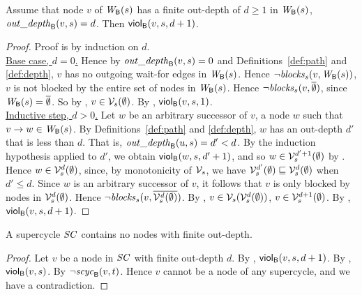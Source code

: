 \begin{proposition} \label{prop:outdepth-finite-implies-scViol}
Assume that node $v$ of $\wfg{\B}{s}$ has a finite out-depth of $d \ge 1$ in $\wfg{\B}{s}$, \ie 
$\wodepth{\B}{v}{s} = d$. Then $\viol{v}{d+1}{s}$. 
\end{proposition}
%
\begin{proof}
Proof is by induction on $d$.\\

\noindent
\ul{Base case, $d=0$.} Hence by $\wodepth{\B}{v}{s} = 0$ and Definitions~\ref{def:path} and \ref{def:depth},  
$v$ has no outgoing wait-for edges in $\wfg{\B}{s}$. Hence $\neg \blocks{s}{v}{\wfg{\B}{s}}$, \ie $v$ is not blocked by the entire set of nodes in 
$\wfg{\B}{s}$. Hence $\neg \blocks{s}{v}{\compl{\ewfg}}$, since $\wfg{\B}{s} = \compl{\ewfg}$. So by , 
$v \in \VFs{s}{\ewfg}$. By , $\scVd{v}{1}{s}$.\\

\noindent
\ul{Inductive step, $d > 0$.}
Let $w$ be an arbitrary successor of $v$, \ie a node $w$ such that $v \ar w \in \wfg{\B}{s}$.
By Definitions~\ref{def:path} and \ref{def:depth}, $w$ has an out-depth $d'$ that is less than $d$. 
That is, $\wodepth{\B}{u}{s} = d' < d$.
By the induction hypothesis applied to $d'$, we obtain $\viol{w}{d'+1}{s}$, and so $w \in \VFsi{s}{\ewfg}{d'+1}$ by .
Hence $w \in \VFsi{s}{\ewfg}{d}$, since, by monotonicity of $\VFsymb_s$, we have 
$ \VFsi{s}{\ewfg}{d'} \subg  \VFsi{s}{\ewfg}{d}$ when $d' \le d$.
Since  $w$ is an arbitrary successor of $v$, it follows that $v$ is only blocked by nodes in $\VFsi{s}{\ewfg}{d}$.
Hence $\neg \blocks{s}{v}{\compl{ \VFsi{s}{\ewfg}{d} } }$.
By , $v \in \VFs{s}{\VFsi{s}{\ewfg}{d}}$, \ie $v \in  \VFsi{s}{\ewfg}{d+1}$.
By , $\scVd{v}{d+1}{s}$.
\end{proof}




\begin{corollary} 
\label{cor:supercycle:no-finite-outdepth}
A supercycle $\SC$ contains no nodes with finite out-depth.
\end{corollary}
%
\begin{proof} 
Let $v$ be a node in $\SC$ with finite out-depth $d$.
By , $\scVd{v}{d+1}{s}$.
By , $\scV{v}{s}$.
By  $\neg \scyc{\B}{t}{v}$. Hence $v$ cannot be a node of any supercycle, and we have a contradiction.
\end{proof}








